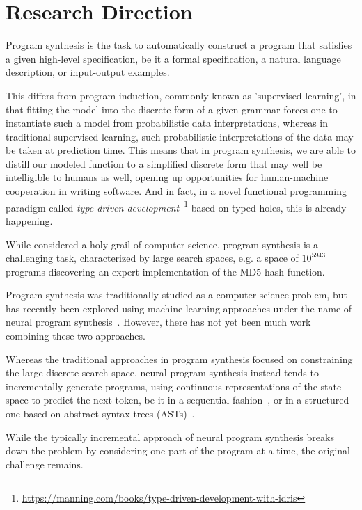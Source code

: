 \documentclass{article}
\begin{document}


\section{Research Direction}

Program synthesis is the task to automatically construct a program that satisfies a given high-level specification,
be it a formal specification, a natural language description, or input-output examples.

This differs from program induction, commonly known as 'supervised learning',
in that fitting the model into the discrete form of a given grammar
forces one to instantiate such a model from probabilistic data interpretations,
whereas in traditional supervised learning,
such probabilistic interpretations of the data may be taken at prediction time.
% 
This means that in program synthesis, we are able to distill our modeled function
to a simplified discrete form that may well be intelligible to humans as well,
opening up opportunities for human-machine cooperation in writing software.
% 
And in fact, in a novel functional programming paradigm called
\emph{type-driven development}~\footnote{\url{https://manning.com/books/type-driven-development-with-idris}}
based on typed holes, this is already happening.

While considered a holy grail of computer science, program synthesis is a challenging task, characterized by large search spaces, e.g. a space of $10^{5943}$ programs discovering an expert implementation of the MD5 hash function.~\cite{gulwani2017program}

Program synthesis was traditionally studied as a computer science problem, but has recently been explored using machine learning approaches under the name of neural program synthesis~\citep{nps}.
However, there has not yet been much work combining these two approaches.

Whereas the traditional approaches in program synthesis focused on constraining the large discrete search space, neural program synthesis instead tends to incrementally generate programs, using continuous representations of the state space to predict the next token, be it in a sequential fashion~\citep{alphanpi}, or in a structured one based on abstract syntax trees (ASTs)~\citep{nsps}.

While the typically incremental approach of neural program synthesis breaks down the problem by considering one part of the program at a time, the original challenge remains.
\end{document}
